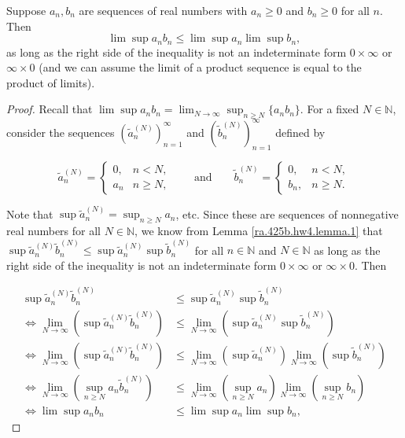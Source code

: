 \begin{lemma}\label{ra.425b.hw4.lemma.2}

 Suppose $a_n, b_n$ are sequences of real numbers with $a_n \geq 0$ and $b_n \geq 0$ for all $n$. Then
\[
\lim \sup a_n b_n \leq \lim \sup a_n \lim \sup b_n,
\]
as long as the right side of the inequality is not an indeterminate form $0 \times \infty$ or $\infty \times 0$ (and we can assume the limit of a product sequence is equal to the product of limits).

\end{lemma}

\begin{proof}

Recall that \(\lim \sup a_n b_n = \lim_{N \to \infty} \sup_{n \geq N} \{ a_n b_n \}\). For a fixed \(N \in \mathbb{N}\), consider the sequences \(\left(\tilde{a}_n^{(N)}  \right)_{n=1}^\infty\) and \(\left(\tilde{b}_n^{(N)} \right)_{n=1}^\infty\)  defined by


\[
\tilde{a}_n^{(N)}  = \begin{cases}
0, & n < N ,\\
a_n  & n \geq N,
\end{cases} \qquad \text{and} \qquad
 \tilde{b}_n^{(N)} = \begin{cases}
0, & n < N ,\\
 b_n, & n \geq N.
\end{cases}
\]

Note that \( \sup \tilde{a}_n^{(N)} = \sup_{n \geq N} a_n  \), etc. Since these are sequences of nonnegative real numbers for all \(N \in \mathbb{N}\), we know from Lemma \ref{ra.425b.hw4.lemma.1} that $\sup \tilde{a}_n^{(N)}  \tilde{b}_n^{(N)} \leq \sup \tilde{a}_n^{(N)} \sup  \tilde{b}_n^{(N)}$ for all \(n \in \mathbb{N}\) and \(N \in \mathbb{N}\) as long as the right side of the inequality is not an indeterminate form $0 \times \infty$ or $\infty \times 0$. Then

\begin{align*}
\sup \tilde{a}_n^{(N)}  \tilde{b}_n^{(N)} & \leq \sup \tilde{a}_n^{(N)} \sup  \tilde{b}_n^{(N)}
\\ \iff \lim_{N \to \infty} \left( \sup \tilde{a}_n^{(N)}  \tilde{b}_n^{(N)} \right)  & \leq  \lim_{N \to \infty} \left(  \sup \tilde{a}_n^{(N)} \sup  \tilde{b}_n^{(N)} \right)
\\ \iff \lim_{N \to \infty} \left( \sup \tilde{a}_n^{(N)}  \tilde{b}_n^{(N)} \right)  & \leq  \lim_{N \to \infty} \left(  \sup \tilde{a}_n^{(N)} \right)  \lim_{N \to \infty} \left( \sup  \tilde{b}_n^{(N)} \right)
\\ \iff \lim_{N \to \infty} \left( \sup_{n \geq N} a_n  \tilde{b}_n^{(N)} \right)  & \leq  \lim_{N \to \infty} \left(  \sup_{n \geq N} a_n \right)  \lim_{N \to \infty} \left( \sup_{n \geq N}  b_n \right)
\\ \iff \lim \sup a_n b_n & \leq \lim \sup a_n \lim \sup b_n,
\end{align*}


\end{proof}

